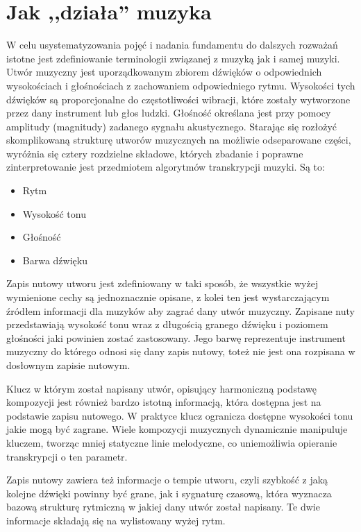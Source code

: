 \documentclass[12pt,a4paper,twoside]{mwart}
\begin{document}
\newpage
\setcounter{secnumdepth}{4}

\section{Jak ,,działa'' muzyka}\label{sec:JakDzialaMuzyka}
W celu usystematyzowania pojęć i nadania fundamentu do dalszych rozważań istotne jest zdefiniowanie terminologii związanej z muzyką jak i samej muzyki. Utwór muzyczny jest uporządkowanym zbiorem dźwięków o odpowiednich wysokościach i głośnościach z zachowaniem odpowiedniego rytmu. Wysokości tych dźwięków są proporcjonalne do częstotliwości wibracji, które zostały wytworzone przez dany instrument lub głos ludzki. Głośność określana jest przy pomocy amplitudy (magnitudy) zadanego sygnału akustycznego. Starając się rozłożyć skomplikowaną strukturę utworów muzycznych na możliwie odseparowane części, wyróżnia się cztery rozdzielne składowe, których zbadanie i poprawne zinterpretowanie jest przedmiotem algorytmów transkrypcji muzyki. Są to:
\begin{itemize}
\item Rytm
\item Wysokość tonu
\item Głośność
\item Barwa dźwięku
\end{itemize}
Zapis nutowy utworu jest zdefiniowany w taki sposób, że wszystkie wyżej wymienione cechy są jednoznacznie opisane, z kolei ten jest wystarczającym źródłem informacji dla muzyków aby zagrać dany utwór muzyczny. Zapisane nuty przedstawiają wysokość tonu wraz z długością granego dźwięku i poziomem głośności jaki powinien zostać zastosowany. Jego barwę reprezentuje instrument muzyczny do którego odnosi się dany zapis nutowy, toteż nie jest ona rozpisana w dosłownym zapisie nutowym.

Klucz w którym został napisany utwór, opisujący harmoniczną podstawę kompozycji jest również bardzo istotną informacją, która dostępna jest na podstawie zapisu nutowego. W praktyce klucz ogranicza dostępne wysokości tonu jakie mogą być zagrane. Wiele kompozycji muzycznych dynamicznie manipuluje kluczem, tworząc mniej statyczne linie melodyczne, co uniemożliwia opieranie transkrypcji o ten parametr.

Zapis nutowy zawiera też informacje o tempie utworu, czyli szybkość z jaką kolejne dźwięki powinny być grane, jak i sygnaturę czasową, która wyznacza bazową strukturę rytmiczną w jakiej dany utwór został napisany. Te dwie informacje składają się na wylistowany wyżej rytm.
\end{document}
